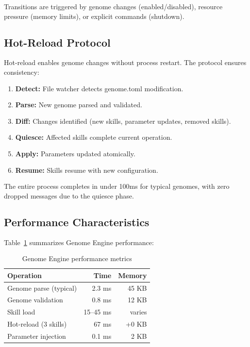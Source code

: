 \documentclass{article}
\begin{document}
Transitions are triggered by genome changes (enabled/disabled), resource pressure (memory limits), or explicit commands (shutdown).

\subsection{Hot-Reload Protocol}

Hot-reload enables genome changes without process restart. The protocol ensures consistency:

\begin{enumerate}[leftmargin=*]
    \item \textbf{Detect:} File watcher detects genome.toml modification.
    \item \textbf{Parse:} New genome parsed and validated.
    \item \textbf{Diff:} Changes identified (new skills, parameter updates, removed skills).
    \item \textbf{Quiesce:} Affected skills complete current operation.
    \item \textbf{Apply:} Parameters updated atomically.
    \item \textbf{Resume:} Skills resume with new configuration.
\end{enumerate}

The entire process completes in under 100ms for typical genomes, with zero dropped messages due to the quiesce phase.

\subsection{Performance Characteristics}

Table~\ref{tab:engine_perf} summarizes Genome Engine performance:

\begin{table}[h]
\centering
\caption{Genome Engine performance metrics}
\label{tab:engine_perf}
\begin{tabular}{lrr}
\toprule
\textbf{Operation} & \textbf{Time} & \textbf{Memory} \\
\midrule
Genome parse (typical) & 2.3 ms & 45 KB \\
Genome validation & 0.8 ms & 12 KB \\
Skill load & 15--45 ms & varies \\
Hot-reload (3 skills) & 67 ms & +0 KB \\
Parameter injection & 0.1 ms & 2 KB \\
\bottomrule
\end{tabular}
\end{table}
\end{document}
